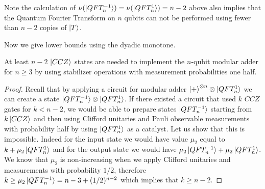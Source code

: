 \documentclass[12pt]{dalthesis}
\begin{document}
Note the calculation of $\nu(\ket{QFT_n^{-1}}) = \nu(\ket{QFT_n^{1}}) = n-2$ above also implies that the Quantum Fourier Transform on $n$ qubits can not be performed using fewer than $n-2$ copies of $\ket{T}$.

Now we give lower bounds using the dyadic monotone.


\begin{lemma}
At least $n-2$ $\ket{CCZ}$ states are needed to implement the $n$-qubit modular adder for $n \geq 3$ by using stabilizer operations with measurement probabilities one half.
\end{lemma}
\begin{proof}
Recall that by applying a circuit for modular adder $\ket{+}^{\otimes n} \otimes \ket{QFT_n^1}$ we can create a state $\ket{QFT_n^{-1}} \otimes \ket{QFT_n^1}$. If there existed a circuit that used $k$ $CCZ$ gates for $k < n-2$, we would be able to prepare states $\ket{QFT_n^{-1}}$ starting from $k \ket{CCZ}$ and then using Clifford unitaries and Pauli observable measurements with probability half by using $\ket{QFT_n^1}$ as a catalyst. Let us show that this is impossible. Indeed for the input state we would have value $\mu_2$ equal to $k + \mu_2 \ket{QFT_n^1}$ and for the output state we would have $\mu_2 \ket{QFT_n^{-1}} + \mu_2 \ket{QFT_n^1}$. We know that $\mu_2$ is non-increasing when we apply Clifford unitaries and measurements with probability $1/2$, therefore $k \geq \mu_2 \ket{QFT_n^{-1}} = n - 3 +(1/2)^{n-2}$ which implies that $k \geq n-2$.
\end{proof}
\end{document}
